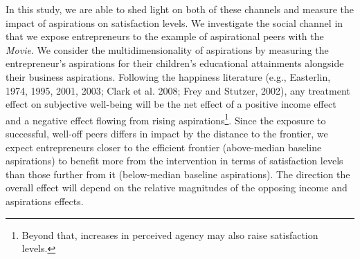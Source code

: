 \documentclass[11.5pt]{article}
\begin{document}
In this study, we are able to shed light on both of these channels and measure the impact of aspirations on satisfaction levels. We investigate the social channel in that we expose entrepreneurs to the example of aspirational peers with the \emph{Movie}. We consider the multidimensionality of aspirations by measuring the entrepreneur's aspirations for their children's educational attainments alongside their business aspirations. %
Following the happiness literature (e.g., Easterlin, 1974, 1995, 2001, 2003; Clark et al. 2008; Frey and Stutzer, 2002), any treatment effect on subjective well-being will be the net effect of a positive income effect and a negative effect flowing from rising aspirations\footnote{Beyond that, increases in perceived agency may also raise satisfaction levels.}. Since the exposure to successful, well-off peers differs in impact by the distance to the frontier, we expect entrepreneurs closer to the efficient frontier (above-median baseline aspirations) to benefit more from the intervention in terms of satisfaction levels than those further from it (below-median baseline aspirations). The direction the overall effect will depend on the relative magnitudes of the opposing income and aspirations effects.
\end{document}

